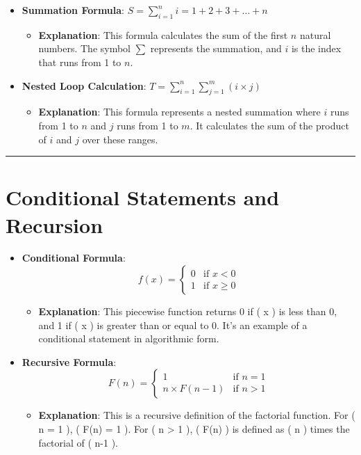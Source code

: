 \documentclass[
  letterpaper,
  DIV=11,
  numbers=noendperiod]{scrreprt}
\providecommand{\tightlist}{%
  \setlength{\itemsep}{0pt}\setlength{\parskip}{0pt}}\usepackage{longtable,booktabs,array}
\begin{document}
\begin{itemize}
\item
  \textbf{Summation Formula}:
  \(S = \sum_{i=1}^{n} i = 1 + 2 + 3 + \dots + n\)

  \begin{itemize}
  \tightlist
  \item
    \textbf{Explanation}: This formula calculates the sum of the first
    \(n\) natural numbers. The symbol \(\sum\) represents the summation,
    and \(i\) is the index that runs from 1 to \(n\).
  \end{itemize}
\item
  \textbf{Nested Loop Calculation}:
  \(T = \sum_{i=1}^{n} \sum_{j=1}^{m} (i \times j)\)

  \begin{itemize}
  \tightlist
  \item
    \textbf{Explanation}: This formula represents a nested summation
    where \(i\) runs from 1 to \(n\) and \(j\) runs from 1 to \(m\). It
    calculates the sum of the product of \(i\) and \(j\) over these
    ranges.
  \end{itemize}
\end{itemize}

\begin{center}\rule{0.5\linewidth}{0.5pt}\end{center}

\section{Conditional Statements and
Recursion}\label{conditional-statements-and-recursion}

\begin{itemize}
\item
  \textbf{Conditional Formula}: \[
  f(x) = 
  \begin{cases} 
  0 & \text{if } x < 0 \\
  1 & \text{if } x \geq 0
  \end{cases}
  \]

  \begin{itemize}
  \tightlist
  \item
    \textbf{Explanation}: This piecewise function returns 0 if ( x ) is
    less than 0, and 1 if ( x ) is greater than or equal to 0. It's an
    example of a conditional statement in algorithmic form.
  \end{itemize}
\item
  \textbf{Recursive Formula}: \[
  F(n) = 
  \begin{cases}
  1 & \text{if } n = 1 \\
  n \times F(n-1) & \text{if } n > 1
  \end{cases}
  \]

  \begin{itemize}
  \tightlist
  \item
    \textbf{Explanation}: This is a recursive definition of the
    factorial function. For ( n = 1 ), ( F(n) = 1 ). For ( n
    \textgreater{} 1 ), ( F(n) ) is defined as ( n ) times the factorial
    of ( n-1 ).
  \end{itemize}
\end{itemize}
\end{document}
